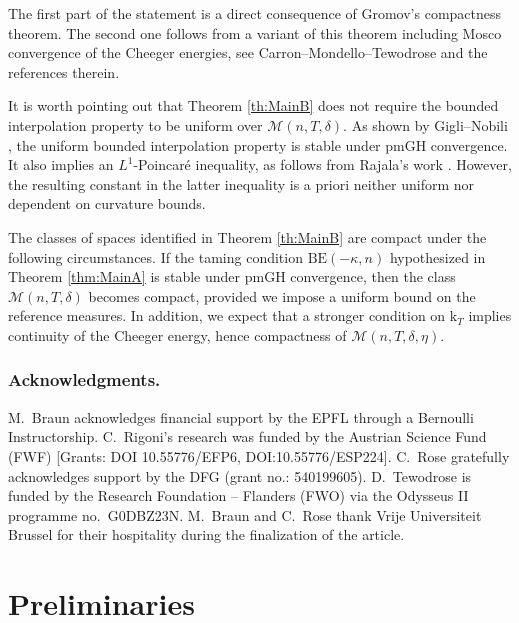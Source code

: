 \documentclass[10pt]{article}
\renewcommand{\k}{\mathrm{k}}
\newcommand{\BE}{{\mathrm{BE}}}
\theoremstyle{plain}
\theoremstyle{definition}
\begin{document}
The first part of the statement is a direct consequence of Gromov's compactness theorem. The second one follows from a variant of this theorem including Mosco convergence of the Cheeger energies, see Carron--Mondello--Tewodrose \cite[Theorem 1.17]{CMT} and the references therein. 

It is worth pointing out that Theorem \ref{th:MainB} does not require the bounded interpolation property to be uniform over $\mathcal{M}(n,T,\delta)$. As shown by Gigli--Nobili \cite{GigliNobili}, the uniform bounded interpolation property is stable under pmGH convergence. It also implies an $L^1$-Poincaré inequality, as follows from Rajala's work \cite{Rajala}. However, the resulting constant in the latter inequality is a priori neither uniform nor dependent on curvature bounds.

The classes of spaces identified in Theorem \ref{th:MainB} are compact under the following circumstances. If the taming condition $\BE(-\kappa,n)$ hypothesized in Theorem \ref{thm:MainA} is stable under pmGH convergence, then the class $\mathcal{M}(n,T,\delta)$ becomes compact, provided we impose a uniform bound on the reference measures. In addition, we expect that a stronger condition on $\k_T$ implies continuity of the Cheeger energy, hence compactness of $\mathcal{M}(n,T,\delta,\eta)$.


\subsubsection*{Acknowledgments.} M.~Braun acknowledges financial support by the EPFL through a Bernoulli Instructorship. C.~Rigoni's research was funded by the Austrian Science Fund (FWF) [Grants: DOI 10.55776/EFP6, DOI:10.55776/ESP224]. C.~Rose gratefully acknowledges support by the DFG (grant no.: 540199605). D.~Tewodrose is funded by the Research Foundation – Flanders (FWO) via the Odysseus II programme no.~G0DBZ23N. M.~Braun and C.~Rose thank Vrije Universiteit Brussel for their hospitality during the finalization of the article. 

\section{Preliminaries}
\end{document}
